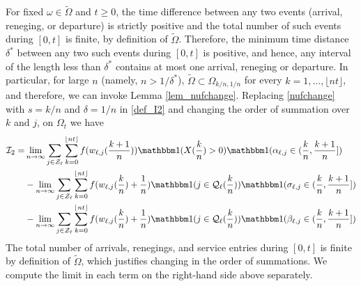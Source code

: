 \documentclass{article}
\theoremstyle{definition}
\numberwithin{equation}{section}
\begin{document}
For fixed $\omega\in\tilde\Omega$ and $t\geq0$, the time difference between any two events (arrival, reneging, or departure) is strictly positive and the total number of such events during $[0,t]$ is finite, by definition of $\tilde\Omega$.  Therefore, the minimum time distance $\delta^*$ between any two such events during $[0,t]$ is positive, and hence, any interval of the length less than $\delta^*$ contains at most one arrival, reneging or departure. In particular, for large $n$ (namely, $n>1/\delta^*$), $\tilde\Omega\subset\Omega_{k/n,1/n}$ for every $k=1,...,\lfloor nt \rfloor$, and therefore, we can invoke Lemma \ref{lem_nufchange}. Replacing \eqref{nufchange} with $s=k/n$ and $\delta=1/n$ in \eqref{def_I2} and changing the order of summation over $k$ and $j$, on $\Omega_t$ we have
\begin{subequations}\label{I2}
\begin{align}
  \mathcal{I}_2= & \lim_{n\to\infty}\sum_{j\in\indexSet_\ell}\sum_{k=0}^{\lfloor nt\rfloor}  f(w_{\ell,j}(\frac{k+1}{n}))\indicil{X(\frac{k}{n})>0} \indicil{\arrivaltime_{\ell,j}\in(\frac{k}{n},\frac{k+1}{n}]}\label{I2_arrival}\\
      &- \lim_{n\to\infty}\sum_{j\in\indexSet_\ell}\sum_{k=0}^{\lfloor nt\rfloor}  f(w_{\ell,j}(\frac{k}{n})+\frac{1}{n}) \indicil{j\in\inque_\ell(\frac{k}{n})}\indicil{\renegtime_{\ell,j}\in(\frac{k}{n},\frac{k+1}{n}]} \label{I2_reneg}\\
            &-\lim_{n\to\infty}\sum_{j\in\indexSet_\ell}\sum_{k=0}^{\lfloor nt\rfloor} f(w_{\ell,j}(\frac{k}{n})+\frac{1}{n})\indicil{j\in\inque_\ell(\frac{k}{n})}\indicil{\entrytime_{\ell,j}\in(\frac{k}{n},\frac{k+1}{n}]}\label{I2_K1}
\end{align}
\end{subequations}
The total number of arrivals, renegings, and service entries during $[0,t]$ is finite by definition of $\tilde\Omega$, which justifies changing in the order of summations. We compute the limit in each term on the right-hand side above separately.
\end{document}
